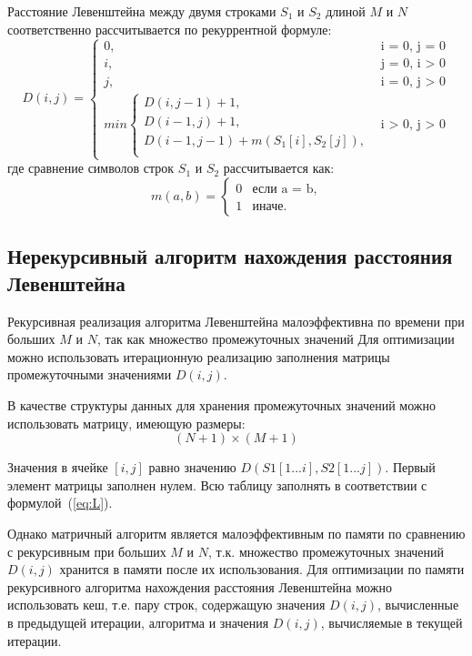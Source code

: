 Расстояние Левенштейна между двумя строками $S_{1}$ и $S_{2}$ длиной $M$ и $N$ соответственно рассчитывается по рекуррентной формуле:
\begin{equation}
	\label{eq:L}
	D(i, j) =
	\begin{cases}
		0, &\text{i = 0, j = 0}\\
		i, &\text{j = 0, i > 0}\\
		j, &\text{i = 0, j > 0}\\
		min \begin{cases}
			D(i, j - 1) + 1,\\
			D(i - 1, j) + 1,\\
			D(i - 1, j - 1) +  m(S_{1}[i], S_{2}[j]), \\
		\end{cases}
		&\text{i > 0, j > 0}
	\end{cases}
\end{equation}
где сравнение символов строк $S_1$ и $S_2$ рассчитывается как:
\begin{equation}
	\label{eq:m}
	m(a, b) = \begin{cases}
		0 &\text{если a = b,}\\
		1 &\text{иначе.}
	\end{cases}
\end{equation}

\subsection{Нерекурсивный алгоритм нахождения расстояния Левенштейна}

Рекурсивная реализация алгоритма Левенштейна малоэффективна по времени при больших $M$ и $N$, так как множество промежуточных значений  Для оптимизации можно использовать итерационную реализацию заполнения матрицы промежуточными значениями $D(i,j)$.

В качестве структуры данных для хранения промежуточных значений можно использовать матрицу, имеющую размеры:
\begin{equation}
	\label{eq:lev-m-size}
	(N + 1) \times (M + 1)
\end{equation}

Значения в ячейке $[i, j]$ равно значению $D(S1[1...i], S2[1...j])$. Первый элемент матрицы заполнен нулем. Всю таблицу заполнять в соответствии с формулой~(\ref{eq:L}). 

Однако матричный алгоритм является малоэффективным по памяти по сравнению с рекурсивным при больших $M$ и $N$, т.к. множество промежуточных значений $D(i,j)$ хранится в памяти после их использования. Для оптимизации по памяти рекурсивного алгоритма нахождения расстояния Левенштейна можно использовать кеш, т.е. пару строк, содержащую значения $D(i,j)$, вычисленные в предыдущей итерации, алгоритма и значения $D(i,j)$, вычисляемые в текущей итерации.

